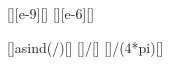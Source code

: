 [\nano\meter][e-9][\m]
[\micro\meter][e-6][\m]

[\arcsin{}]{asind(\laX/\bsX)}[\degree]
[]{\nchX/\bsX}[\kgmps]
[]{\nchX/(4*pi)}[\joule\second]
